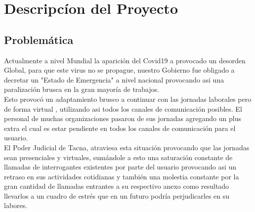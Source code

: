 \documentclass[twoside,twocolumn]{article}
\begin{document}
\section{Descripcíon del Proyecto}
\subsection{Problemática}
Actualmente a nivel Mundial la aparición del Covid19 a provocado un desorden Global, para que este virus no se propague, nuestro Gobierno fue obligado a decretar un "Estado de Emergencia" a nivel nacional provocando asi una paralización brusca en la gran mayoría de trabajos.
\\
Esto provocó un adaptamiento brusco a continuar con las jornadas laborales pero de forma virtual , utilizando asi todos los canales de comunicación posibles.
El personal de muchas organizaciones pasaron de sus jornadas agregando un plus extra el cual es estar pendiente en todos los canales de comunicación para el usuario.
\\
El Poder Judicial de Tacna, atraviesa esta situación provocando que las jornadas sean presenciales y virtuales, sumándole a esto una saturación constante de llamadas de   interrogantes existentes por parte del usuario provocando asi un retraso en sus actividades cotidianas y también una molestia constante por la gran cantidad de llamadas entrantes a su respectivo anexo como resultado llevarlos a un cuadro de estrés que en un futuro podría perjudicarles en su labores.
\end{document}
